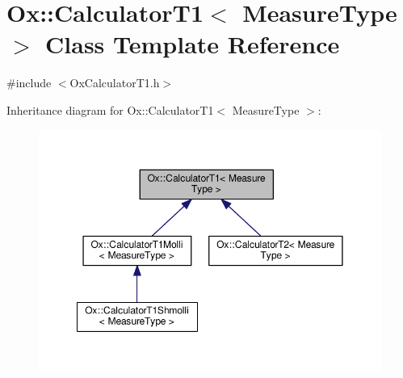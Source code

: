 \hypertarget{class_ox_1_1_calculator_t1}{\section{Ox\-:\-:Calculator\-T1$<$ Measure\-Type $>$ Class Template Reference}
\label{class_ox_1_1_calculator_t1}
}


{\ttfamily \#include $<$Ox\-Calculator\-T1.\-h$>$}



Inheritance diagram for Ox\-:\-:Calculator\-T1$<$ Measure\-Type $>$\-:
\nopagebreak
\begin{figure}[H]
\begin{center}
\leavevmode
\includegraphics[width=350pt]{class_ox_1_1_calculator_t1__inherit__graph}
\end{center}
\end{figure}
